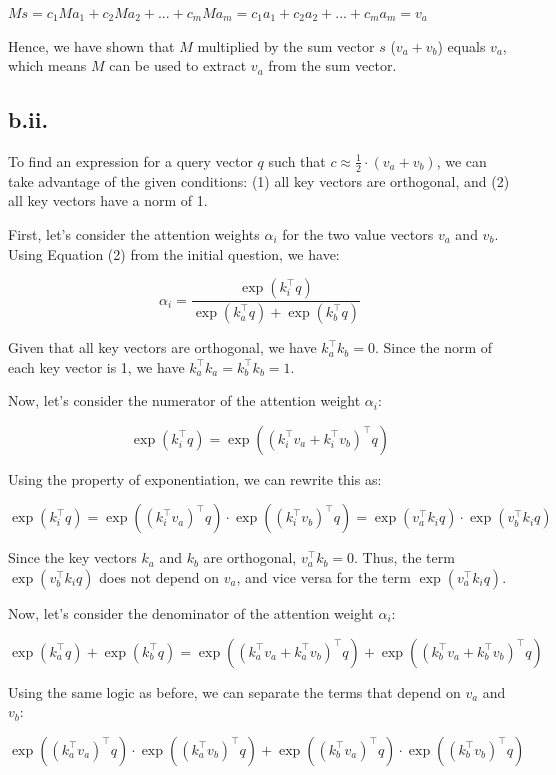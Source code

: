 \documentclass[a4paper]{article}
\begin{document}
$Ms = c_1Ma_1 + c_2Ma_2 + ... + c_mMa_m = c_1a_1 + c_2a_2 + ... + c_ma_m = v_a$

Hence, we have shown that $M$ multiplied by the sum vector $s$ ($v_a + v_b$) equals $v_a$, which means $M$ can be used to extract $v_a$ from the sum vector.


\subsection*{b.ii.}

To find an expression for a query vector $q$ such that $c \approx \frac{1}{2} \cdot (v_a + v_b)$, we can take advantage of the given conditions: (1) all key vectors are orthogonal, and (2) all key vectors have a norm of 1.

First, let's consider the attention weights $\alpha_i$ for the two value vectors $v_a$ and $v_b$. Using Equation (2) from the initial question, we have:

\[
\alpha_i = \frac{{\exp(k_i^\top q)}}{{\exp(k_a^\top q) + \exp(k_b^\top q)}}
\]

Given that all key vectors are orthogonal, we have $k_a^\top k_b = 0$. Since the norm of each key vector is 1, we have $k_a^\top k_a = k_b^\top k_b = 1$.

Now, let's consider the numerator of the attention weight $\alpha_i$:

\[
\exp(k_i^\top q) = \exp\left((k_i^\top v_a + k_i^\top v_b)^\top q\right)
\]

Using the property of exponentiation, we can rewrite this as:

\[
\exp(k_i^\top q) = \exp((k_i^\top v_a)^\top q) \cdot \exp((k_i^\top v_b)^\top q) = \exp(v_a^\top k_i q) \cdot \exp(v_b^\top k_i q)
\]

Since the key vectors $k_a$ and $k_b$ are orthogonal, $v_a^\top k_b = 0$. Thus, the term $\exp(v_b^\top k_i q)$ does not depend on $v_a$, and vice versa for the term $\exp(v_a^\top k_i q)$.

Now, let's consider the denominator of the attention weight $\alpha_i$:

\[
\exp(k_a^\top q) + \exp(k_b^\top q) = \exp((k_a^\top v_a + k_a^\top v_b)^\top q) + \exp((k_b^\top v_a + k_b^\top v_b)^\top q)
\]

Using the same logic as before, we can separate the terms that depend on $v_a$ and $v_b$:

\[
\exp((k_a^\top v_a)^\top q) \cdot \exp((k_a^\top v_b)^\top q) + \exp((k_b^\top v_a)^\top q) \cdot \exp((k_b^\top v_b)^\top q)
\]
\end{document}
